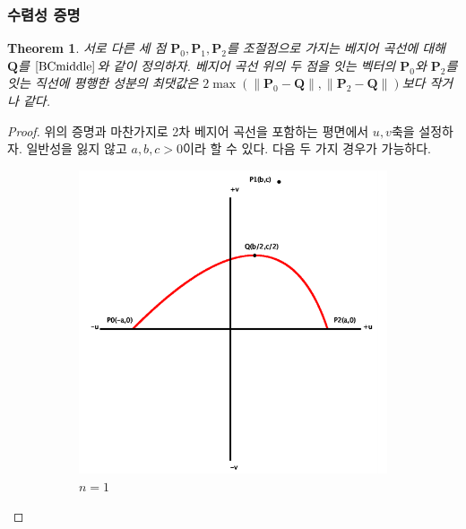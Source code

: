 \documentclass{gshs_thesis}
\theoremstyle{theorem}
\newtheorem{theorem}{Theorem}[section]
\theoremstyle{lemma}
\theoremstyle{definition}
\begin{document}
\subsubsection{수렴성 증명}
\begin{theorem} \label{BCproof2}
	서로 다른 세 점 $\textbf{P}_{0},\textbf{P}_{1},\textbf{P}_{2}$를 조절점으로 가지는 베지어 곡선에 대해 $\textbf{Q}$를 $\eqref{BCmiddle}$와 같이 정의하자. 베지어 곡선 위의 두 점을 잇는 벡터의 $\textbf{P}_{0}$와 $\textbf{P}_{2}$를 잇는 직선에 평행한 성분의 최댓값은 $2\max(\parallel\textbf{P}_{0}-\textbf{Q}\parallel,\parallel\textbf{P}_{2}-\textbf{Q}\parallel)$보다 작거나 같다. 
\end{theorem}
\begin{proof}
	위의 증명과 마찬가지로 2차 베지어 곡선을 포함하는 평면에서 $u,v$축을 설정하자. 일반성을 잃지 않고 $a,b,c>0$이라 할 수 있다. 다음 두 가지 경우가 가능하다.
	\begin{figure}[h]
		\begin{center}
			\begin{subfigure}{.4\textwidth}
				\includegraphics[width=\textwidth]{image/BCcase1}
				\caption{$n=1$}
			\end{subfigure}
			\begin{subfigure}{.4\textwidth}

\end{subfigure}
\end{center}
\end{figure}
\end{proof}
\end{document}
